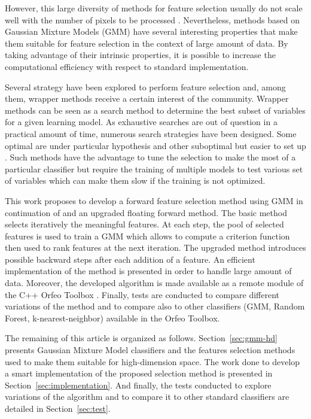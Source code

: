 \documentclass[journal,peerreview,onecolumn]{IEEEtran}
\begin{document}
However, this large diversity of methods for feature selection usually do not scale well with the number of pixels to be processed \cite{fauvel2015fast}. Nevertheless, methods based on Gaussian Mixture Models (GMM) have several interesting properties that make them suitable for feature selection in the context of large amount of data. By taking advantage of their intrinsic properties, it is possible to increase the computational efficiency with respect to standard implementation.

Several strategy have been explored to perform feature selection and, among them, wrapper methods receive a certain interest of the community. Wrapper methods can be seen as a search method to determine the best subset of variables for a given learning model. As exhaustive searches are out of question in a practical amount of time, numerous search strategies have been designed. Some optimal are under particular hypothesis \cite{narendra1977branch} and other suboptimal but easier to set up \cite{whitney1971direct}\cite{somol1999adaptive}. Such methods have the advantage to tune the selection to make the most of a particular classifier but require the training of multiple models to test various set of variables which can make them slow if the training is not optimized.

This work proposes to develop a forward feature selection method using GMM in continuation of \cite{fauvel2015fast} and an upgraded floating forward method. The basic method selects iteratively the meaningful features. At each step, the pool of selected features is used to train a GMM which allows to compute a criterion function then used to rank features at the next iteration. The upgraded method introduces possible backward steps after each addition of a feature. An efficient implementation of the method is presented in order to handle large amount of data. Moreover, the developed algorithm is made available as a remote module of the C++ Orfeo Toolbox \cite{christophe2008orfeo}. Finally, tests are conducted to compare different variations of the method and to compare also to other classifiers (GMM, Random Forest, k-nearest-neighbor) available in the Orfeo Toolbox.

The remaining of this article is organized as follows. Section~\ref{sec:gmm-hd} presents Gaussian Mixture Model classifiers and the features selection methods used to make them suitable for high-dimension space. The work done to develop a smart implementation of the proposed selection method is presented in Section~\ref{sec:implementation}. And finally, the tests conducted to explore variations of the algorithm and to compare it to other standard classifiers are detailed in Section~\ref{sec:test}.
\end{document}
